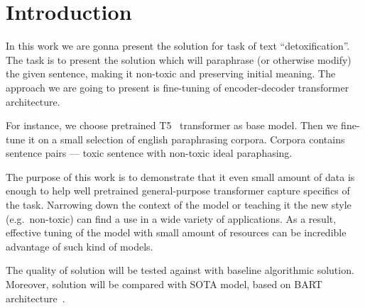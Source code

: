 \section{Introduction}

In this work we are gonna present the solution for task of text
``detoxification''. The task is to present the solution which will paraphrase
(or otherwise modify) the given sentence, making it non-toxic and preserving
initial meaning. The approach we are going to present is fine-tuning of
encoder-decoder transformer architecture.

For instance, we choose pretrained T5~\cite{} transformer as base model. Then
we fine-tune it on a small selection of english paraphrasing corpora. Corpora
contains sentence pairs --- toxic sentence with non-toxic ideal paraphasing.

The purpose of this work is to demonstrate that it even small amount of data is
enough to help well pretrained general-purpose transformer capture specifics of
the task. Narrowing down the context of the model or teaching it the new style
(e.g.~non-toxic) can find a use in a wide variety of applications. As a result,
effective tuning of the model with small amount of resources can be incredible
advantage of such kind of models.

The quality of solution will be tested against with baseline algorithmic
solution. Moreover, solution will be compared with SOTA model, based on BART
architecture~\cite{}.